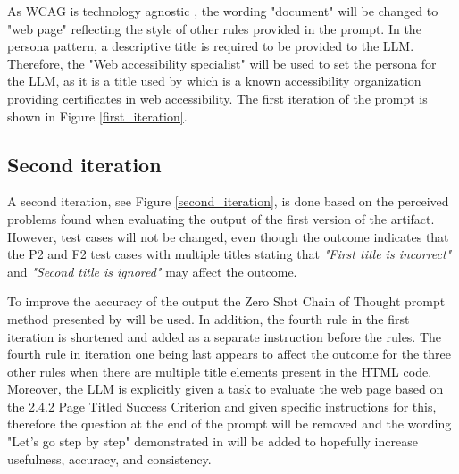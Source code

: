 As WCAG is technology agnostic \citep{wcag22}, the wording "document" will be changed to "web page" reflecting the style of other rules provided in the prompt. In the persona pattern, a descriptive title is required to be provided to the LLM. Therefore, the "Web accessibility specialist" will be used to set the persona for the LLM, as it is a title used by \textcite{web_accessibility_specialist} which is a known accessibility organization providing certificates in web accessibility. The first iteration of the prompt is shown in Figure \ref{first_iteration}.


\subsection{Second iteration}

A second iteration, see Figure \ref{second_iteration}, is done based on the perceived problems found when evaluating the output of the first version of the artifact. However, test cases will not be changed, even though the outcome indicates that the P2 and F2 test cases with multiple titles stating that \textit{"First title is incorrect"} and \textit{"Second title is ignored"} may affect the outcome.

To improve the accuracy of the output the Zero Shot Chain of Thought prompt method presented by \textcite{kojima2023large} will be used. In addition, the fourth rule in the first iteration is shortened and added as a separate instruction before the rules. The fourth rule in iteration one being last appears to affect the outcome for the three other rules when there are multiple title elements present in the HTML code. Moreover, the LLM is explicitly given a task to evaluate the web page based on the 2.4.2 Page Titled Success Criterion and given specific instructions for this, therefore the question at the end of the prompt will be removed and the wording "Let's go step by step" demonstrated in \textcite{kojima2023large} will be added to hopefully increase usefulness, accuracy, and consistency.

